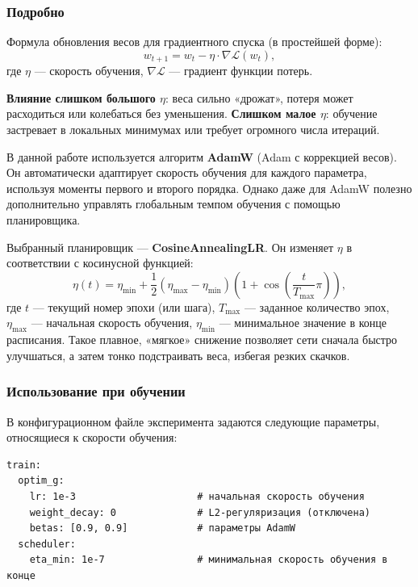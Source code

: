 \documentclass[12pt,a4paper]{article}
\begin{document}
\subsubsection{Подробно}

Формула обновления весов для градиентного спуска (в простейшей форме):
\[
w_{t+1} = w_t - \eta \cdot \nabla \mathcal{L}(w_t),
\]
где \(\eta\) — скорость обучения, \(\nabla \mathcal{L}\) — градиент функции потерь. 

\textbf{Влияние слишком большого \(\eta\)}: веса сильно «дрожат», потеря может расходиться или колебаться без уменьшения. \textbf{Слишком малое \(\eta\)}: обучение застревает в локальных минимумах или требует огромного числа итераций.

В данной работе используется алгоритм \textbf{AdamW} (Adam с коррекцией весов). Он автоматически адаптирует скорость обучения для каждого параметра, используя моменты первого и второго порядка. Однако даже для AdamW полезно дополнительно управлять глобальным темпом обучения с помощью планировщика.

Выбранный планировщик — \textbf{CosineAnnealingLR}. Он изменяет \(\eta\) в соответствии с косинусной функцией:
\[
\eta(t) = \eta_{\min} + \frac{1}{2}(\eta_{\max} - \eta_{\min})\left(1 + \cos\left(\frac{t}{T_{\max}}\pi\right)\right),
\]
где \(t\) — текущий номер эпохи (или шага), \(T_{\max}\) — заданное количество эпох, \(\eta_{\max}\) — начальная скорость обучения, \(\eta_{\min}\) — минимальное значение в конце расписания. Такое плавное, «мягкое» снижение позволяет сети сначала быстро улучшаться, а затем тонко подстраивать веса, избегая резких скачков.

\subsubsection{Использование при обучении}

В конфигурационном файле эксперимента задаются следующие параметры, относящиеся к скорости обучения:

\begin{verbatim}
train:
  optim_g:
    lr: 1e-3                     # начальная скорость обучения
    weight_decay: 0              # L2-регуляризация (отключена)
    betas: [0.9, 0.9]            # параметры AdamW
  scheduler:
    eta_min: 1e-7                # минимальная скорость обучения в конце
\end{verbatim}
\end{document}
